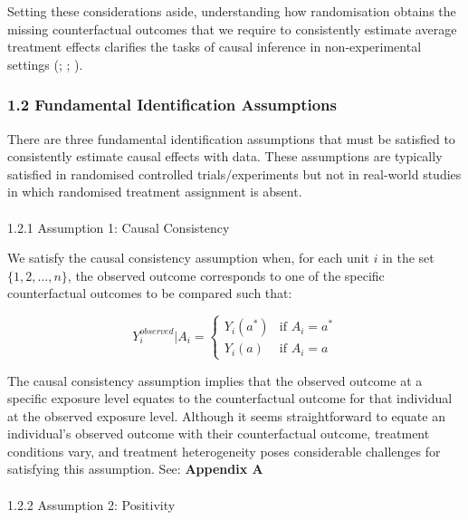 \documentclass[
  single column]{article}
\makeatletter
\let\oldparagraph\paragraph
\renewcommand{\paragraph}{
    \@ifstar
      \xxxParagraphStar
      \xxxParagraphNoStar
  }
\newcommand{\xxxParagraphStar}[1]{\oldparagraph*{#1}\mbox{}}
\newcommand{\xxxParagraphNoStar}[1]{\oldparagraph{#1}\mbox{}}
\makeatother
\begin{document}
Setting these considerations aside, understanding how randomisation
obtains the missing counterfactual outcomes that we require to
consistently estimate average treatment effects clarifies the tasks of
causal inference in non-experimental settings
(;
;
).

\subsubsection{1.2 Fundamental Identification
Assumptions}\label{fundamental-identification-assumptions}

There are three fundamental identification assumptions that must be
satisfied to consistently estimate causal effects with data. These
assumptions are typically satisfied in randomised controlled
trials/experiments but not in real-world studies in which randomised
treatment assignment is absent.

\paragraph{1.2.1 Assumption 1: Causal
Consistency}\label{assumption-1-causal-consistency}

We satisfy the causal consistency assumption when, for each unit \(i\)
in the set \(\{1, 2, \ldots, n\}\), the observed outcome corresponds to
one of the specific counterfactual outcomes to be compared such that:

\[
Y_i^{observed}|A_i = 
\begin{cases} 
Y_i(a^*) & \text{if } A_i = a^* \\
Y_i(a) & \text{if } A_i = a
\end{cases}
\]

The causal consistency assumption implies that the observed outcome at a
specific exposure level equates to the counterfactual outcome for that
individual at the observed exposure level. Although it seems
straightforward to equate an individual's observed outcome with their
counterfactual outcome, treatment conditions vary, and treatment
heterogeneity poses considerable challenges for satisfying this
assumption. See: \textbf{Appendix A}

\paragraph{1.2.2 Assumption 2:
Positivity}\label{assumption-2-positivity}
\end{document}
